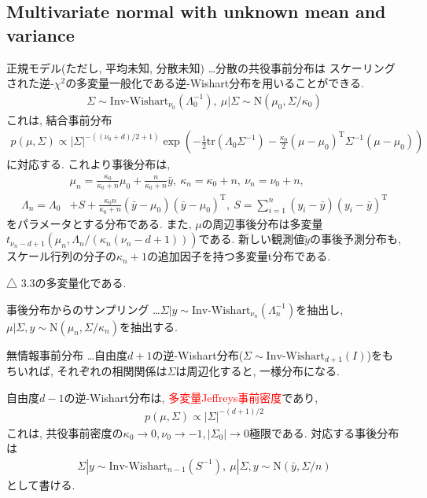 \documentclass[11pt,a4pape,dvipdfmx]{jarticle}
\newcommand{\eqn}[1]{\begin{align*}#1\end{align*}}
\newcommand{\tcr}[1]{\textcolor{red}{#1}}
\begin{document}

\subsection{Multivariate normal with unknown mean and variance}

\begin{itembox}[l]{正規モデル(ただし, 平均未知, 分散未知)}
…分散の共役事前分布は
スケーリングされた逆-$\chi^2$の多変量一般化である逆-Wishart分布を用いることができる.
\eqn{\Sigma\sim\text{Inv-Wishart}_{\nu_0}(\Lambda_0^{-1}),\ \mu|\Sigma\sim\text{N}(\mu_0,\Sigma/\kappa_0)}
これは, 結合事前分布
\eqn{p(\mu,\Sigma)\propto|\Sigma|^{-((\nu_0+d)/2+1)}\exp \left(-\frac{1}{2}\text{tr}(\Lambda_0\Sigma^{-1})-\frac{\kappa_0}{2}(\mu-\mu_0)^{\mathrm{T}}\Sigma^{-1}(\mu-\mu_0)\right)}
に対応する.
これより事後分布は, 
\eqn{&\mu_n=\tfrac{\kappa_0}{\kappa_0+n}\mu_0+\tfrac{n}{\kappa_0+n}\bar{y},\ \kappa_n=\kappa_0+n,\ \nu_n=\nu_0+n,\\
\Lambda_n=\Lambda_0&+S+\tfrac{\kappa_0n}{\kappa_0+n}(\bar{y}-\mu_0)(\bar{y}-\mu_0)^{\mathrm{T}},\ S=\sum_{i=1}^n(y_i-\bar{y})(y_i-\bar{y})^{\mathrm{T}}}
をパラメータとする分布である.
また, $\mu$の周辺事後分布は多変量$t_{\nu_n-d+1}(\mu_n,\Lambda_n/(\kappa_n(\nu_n-d+1)))$である.
新しい観測値$\tilde{y}$の事後予測分布も, スケール行列の分子の$\kappa_n+1$の追加因子を持つ多変量t分布である.
\end{itembox}

△
3.3の多変量化である.


\begin{itembox}[l]{事後分布からのサンプリング}
…$\Sigma|y\sim \text{Inv-Wishart}_{\nu_n}(\Lambda^{- 1}_n)$を抽出し, $\mu|\Sigma,y\sim \text{N}(\mu_n, \Sigma/\kappa_n)$を抽出する.
\end{itembox}



\begin{itembox}[l]{無情報事前分布}
…自由度$d+1$の逆-Wishart分布($\Sigma\sim\text{Inv-Wishart}_{d+1}(I)$)をもちいれば, それぞれの相関関係は$\Sigma$は周辺化すると, 一様分布になる.

自由度$d-1$の逆-Wishart分布は, \tcr{多変量Jeffreys事前密度}であり,
\eqn{p(\mu,\Sigma)\propto|\Sigma|^{-(d+1)/2}}
これは, 共役事前密度の$\kappa_0\rightarrow 0, \nu_0\rightarrow -1, |\Sigma_0|\rightarrow 0$極限である.
対応する事後分布は
\eqn{\Sigma|y\sim \text{Inv-Wishart}_{n-1}(S^{-1}),\ \mu|\Sigma, y\sim \text{N}(\bar{y},\Sigma/n)}
として書ける.
\end{itembox}
\end{document}

